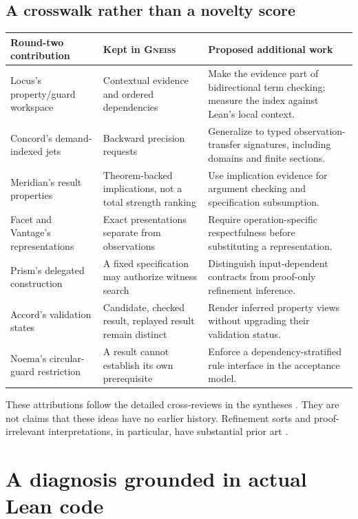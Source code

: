 \documentclass[11pt,letterpaper]{article}
\newcommand{\Gneiss}{\textsc{Gneiss}}
\theoremstyle{definition}
\theoremstyle{remark}
\begin{document}
\subsection{A crosswalk rather than a novelty score}
\begin{center}\small
\begin{tabularx}{\textwidth}{@{}P{1.38in}YY@{}}
\toprule
Round-two contribution & Kept in \Gneiss{} & Proposed additional work\\
\midrule
Locus's property/guard workspace & Contextual evidence and ordered dependencies & Make the evidence part of bidirectional term checking; measure the index against Lean's local context.\\
Concord's demand-indexed jets & Backward precision requests & Generalize to typed observation-transfer signatures, including domains and finite sections.\\
Meridian's result properties & Theorem-backed implications, not a total strength ranking & Use implication evidence for argument checking and specification subsumption.\\
Facet and Vantage's representations & Exact presentations separate from observations & Require operation-specific respectfulness before substituting a representation.\\
Prism's delegated construction & A fixed specification may authorize witness search & Distinguish input-dependent contracts from proof-only refinement inference.\\
Accord's validation states & Candidate, checked result, replayed result remain distinct & Render inferred property views without upgrading their validation status.\\
Noema's circular-guard restriction & A result cannot establish its own prerequisite & Enforce a dependency-stratified rule interface in the acceptance model.\\
\bottomrule
\end{tabularx}
\end{center}
These attributions follow the detailed cross-reviews in the syntheses
\cite{syn-a,syn-b}. They are not claims that these ideas have no earlier history.
Refinement sorts and proof-irrelevant interpretations, in particular, have
substantial prior art \cite{lovas-pfenning}.

\section{A diagnosis grounded in actual Lean code}\label{sec:diagnosis}
\end{document}
